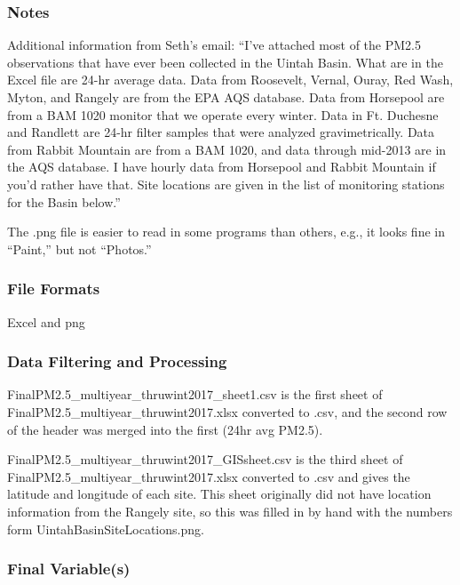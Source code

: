 \subsubsection*{Notes}
Additional information from Seth's email: \newline
``I’ve attached most of the PM2.5 observations that have ever been collected in the Uintah Basin.  What are in the Excel file are 24-hr average data.  Data from Roosevelt, Vernal, Ouray, Red Wash, Myton, and Rangely are from the EPA AQS database. \newline Data from Horsepool are from a BAM 1020 monitor that we operate every winter.  Data in Ft. Duchesne and Randlett are 24-hr filter samples that were analyzed gravimetrically.  Data from Rabbit Mountain are from a BAM 1020, and data through mid-2013 are in the AQS database. \newline \newline
\noindent I have hourly data from Horsepool and Rabbit Mountain if you’d rather have that. \newline \newline
\noindent Site locations are given in the list of monitoring stations for the Basin below.'' \newline

The .png file is easier to read in some programs than others, e.g., it looks fine in ``Paint,'' but not ``Photos.''

\subsubsection*{File Formats} 
Excel and png

\subsubsection*{Data Filtering and Processing}
FinalPM2.5\_multiyear\_thruwint2017\_sheet1.csv is the first sheet of FinalPM2.5\_multiyear\_thruwint2017.xlsx converted to .csv, and the second row of the header was merged into the first (24hr avg PM2.5).

FinalPM2.5\_multiyear\_thruwint2017\_GISsheet.csv is the third sheet of FinalPM2.5\_multiyear\_thruwint2017.xlsx converted to .csv and gives the latitude and longitude of each site. This sheet originally did not have location information from the Rangely site, so this was filled in by hand with the numbers form UintahBasinSiteLocations.png.


\subsubsection*{Final Variable(s)}

